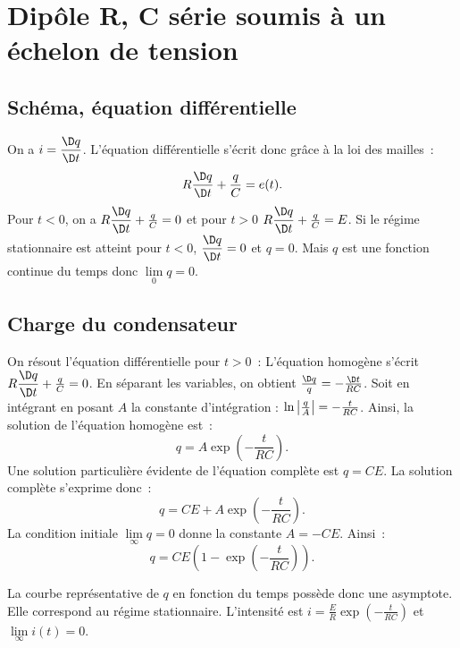 \section{Dipôle R, C série soumis à un échelon de tension}
\subsection{Schéma, équation différentielle}
On a $i = \derived{q}{t}$. L'équation différentielle s'écrit donc grâce à la loi des mailles~:
\begin{equation}
R \derived{q}{t} + \frac{q}{C} = e(t).
\end{equation}
Pour $t < 0$, on a $R \derived{q}{t} + \frac{q}{C} = 0$ et pour $t > 0$ $R \derived{q}{t} + \frac{q}{C} = E$. Si le régime stationnaire est atteint pour $t < 0$, $\derived{q}{t} = 0$ et $q = 0$. Mais $q$ est une fonction continue du temps donc $\lim\limits_{0} q =0$. 

\subsection{Charge du condensateur}
On résout l'équation différentielle pour $t>0$~: L'équation homogène s'écrit $R \derived{q}{t} + \frac{q}{C} =0$. En séparant les variables, on obtient $\frac{\D q}{q} = -\frac{\D t}{R C}$. Soit en intégrant en posant $A$ la constante d'intégration : $\ln{\left\lvert\frac{q}{A}\right\rvert} = -\frac{t}{R C}$.
Ainsi, la solution de l'équation homogène est~:
\begin{equation}
q = A\exp\left(-\frac{t}{RC}\right).
\end{equation}
Une solution particulière évidente de l'équation complète est $q = C E$. La solution complète s'exprime donc~:
\begin{equation}
q = CE + A\exp\left(-\frac{t}{RC}\right).
\end{equation}
La condition initiale $\lim\limits_{\infty} q=0$ donne la constante $A=-CE$. Ainsi~:
\begin{equation}
q = CE\left(1-\exp\left(-\frac{t}{RC}\right)\right).
\end{equation}

La courbe représentative de $q$ en fonction du temps possède donc une asymptote. Elle correspond au régime stationnaire. L'intensité est $i = \frac{E}{R} \exp\left(-\frac{t}{RC}\right)$ et $\lim\limits_{\infty} i(t) = 0$.

